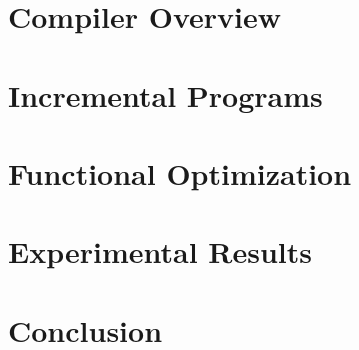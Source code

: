\documentclass{sig-alternate}
\begin{document}
\section{Compiler Overview}
\label{sec:compiler}


\section{Incremental Programs}
\label{sec:iprogram}


\section{Functional Optimization}
\label{sec:functional}


\section{Experimental Results}
\label{sec:experiments}


\section{Conclusion}


\end{document}

